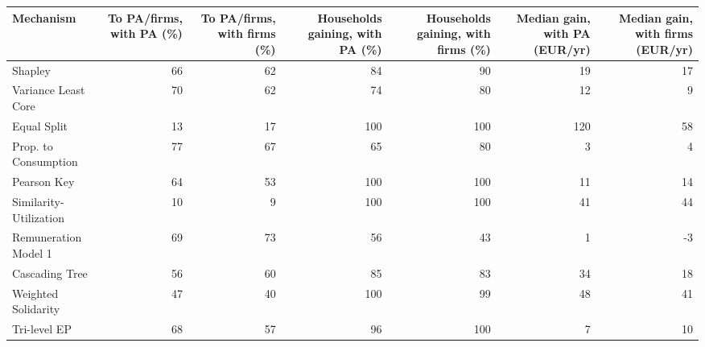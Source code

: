 \begin{tabular}{lrrrrrr}
\toprule
Mechanism & To PA/firms, with PA (\%) & To PA/firms, with firms (\%) & Households gaining, with PA (\%) & Households gaining, with firms (\%) & Median gain, with PA (EUR/yr) & Median gain, with firms (EUR/yr) \\
\midrule
Shapley & 66 & 62 & 84 & 90 & 19 & 17 \\
Variance Least Core & 70 & 62 & 74 & 80 & 12 & 9 \\
Equal Split & 13 & 17 & 100 & 100 & 120 & 58 \\
Prop. to Consumption & 77 & 67 & 65 & 80 & 3 & 4 \\
Pearson Key & 64 & 53 & 100 & 100 & 11 & 14 \\
Similarity-Utilization & 10 & 9 & 100 & 100 & 41 & 44 \\
Remuneration Model 1 & 69 & 73 & 56 & 43 & 1 & -3 \\
Cascading Tree & 56 & 60 & 85 & 83 & 34 & 18 \\
Weighted Solidarity & 47 & 40 & 100 & 99 & 48 & 41 \\
Tri-level EP & 68 & 57 & 96 & 100 & 7 & 10 \\
\bottomrule
\end{tabular}
